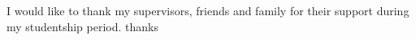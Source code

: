 \renewcommand\listtablename{\normalsize\normalfont\centering\vspace*{-0.5in} ACKNOWLEDGEMENTS}
I would like to thank my supervisors, friends and family for their support during my studentship period. thanks
\iftablespage
{}
{}%